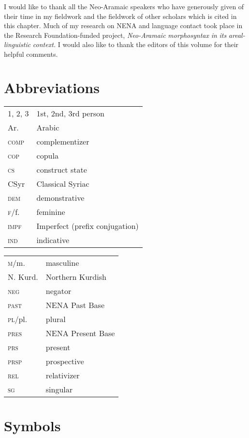 \documentclass[output=paper]{langsci/langscibook}
\begin{document}
I would like to thank all the Neo-Aramaic speakers who have generously given of their time in my fieldwork and the fieldwork of other scholars which is cited in this chapter. Much of my research on NENA and language contact took place in the  Research Foundation-funded project, \textit{Neo-Aramaic} \textit{morphosyntax} \textit{in} \textit{its} \textit{areal-linguistic} \textit{context.} I would also like to thank the editors of this volume for their helpful comments.

\section*{Abbreviations}

\begin{tabularx}{.55\textwidth}{@{}lQ@{}}
\textsc{1, 2, 3} & 1st, 2nd, 3rd person \\
Ar.            & Arabic\\
\textsc{comp}    & {complementizer}\\
\textsc{cop}     & {copula}\\
\textsc{cs}     & construct state\\
CSyr          & Classical Syriac\\
\textsc{dem}     & demonstrative \\
\textsc{f}/f.    & feminine\\
\textsc{impf}   & Imperfect (prefix conjugation)\\
\textsc{ind}     & indicative\\
\end{tabularx}%
\begin{tabularx}{.5\textwidth}{@{}lQ@{}}
\textsc{m}/m.    & masculine\\
N. Kurd.        & Northern Kurdish \\ 
\textsc{neg}    & negator\\
\textsc{past}   & NENA Past Base\\
\textsc{pl}/pl.  & plural\\
\textsc{pres}    & NENA Present Base \\
\textsc{prs}    & present \\
\textsc{prsp}    & {prospective} \\
\textsc{rel}     & {relativizer}\\
\textsc{sg}  & singular
\end{tabularx}%

\section*{Symbols}
\end{document}
